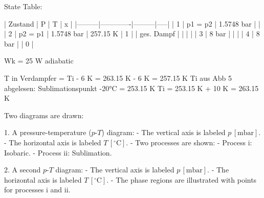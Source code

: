 State Table:  

| Zustand | P           | T       | x   |  
|---------|-------------|---------|-----|  
| 1       | p1 = p2     | 1.5748 bar |       |  
| 2       | p2 = p1     | 1.5748 bar | 257.15 K | 1   |  
| ges. Dampf |           |         |     |  
| 3       | 8 bar       |         |     |  
| 4       | 8 bar       |         | 0   |  

Wk = 25 W adiabatic  

T in Verdampfer = Ti - 6 K = 263.15 K - 6 K = 257.15 K  
Ti aus Abb 5 abgelesen: Sublimationspunkt -20°C = 253.15 K  
Ti = 253.15 K + 10 K = 263.15 K

Two diagrams are drawn:  

1. A pressure-temperature (\( p \)-\( T \)) diagram:  
   - The vertical axis is labeled \( p \, [\text{mbar}] \).  
   - The horizontal axis is labeled \( T \, [^\circ \text{C}] \).  
   - Two processes are shown:  
     - Process i: Isobaric.  
     - Process ii: Sublimation.  

2. A second \( p \)-\( T \) diagram:  
   - The vertical axis is labeled \( p \, [\text{mbar}] \).  
   - The horizontal axis is labeled \( T \, [^\circ \text{C}] \).  
   - The phase regions are illustrated with points for processes i and ii.